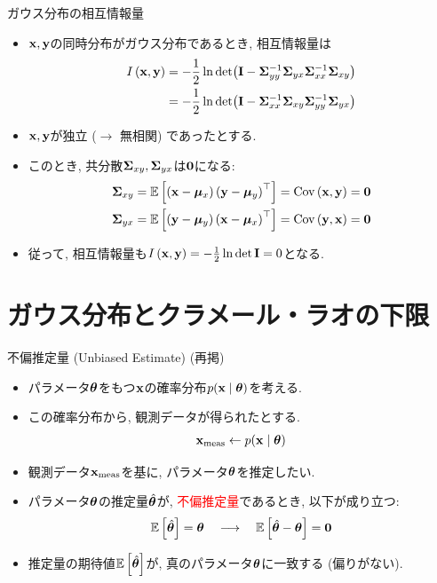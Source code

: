 \documentclass[dvipdfmx,notheorems,t]{beamer}
\begin{document}
\begin{frame}{ガウス分布の相互情報量}
\begin{itemize}
  \item $\vb{x}, \vb{y}$の同時分布がガウス分布であるとき, 相互情報量は
  \begin{align*}
    I \left( \vb{x}, \vb{y} \right) &= -\frac{1}{2} \ln \det(\vb{I}
      - \vb{\Sigma}_{yy}^{-1} \vb{\Sigma}_{yx} \vb{\Sigma}_{xx}^{-1} \vb{\Sigma}_{xy}) \\
      &= -\frac{1}{2} \ln \det(\vb{I}
        - \vb{\Sigma}_{xx}^{-1} \vb{\Sigma}_{xy} \vb{\Sigma}_{yy}^{-1} \vb{\Sigma}_{yx})
  \end{align*}
  \item $\vb{x}, \vb{y}$が独立 ($\to$ 無相関) であったとする.
  \item このとき, 共分散$\vb{\Sigma}_{xy}, \vb{\Sigma}_{yx}$は$\vb{0}$になる:
  \begin{align*}
    \vb{\Sigma}_{xy} &= \operatorname{\mathbb{E}} \left[ \left( \vb{x} - \vb*{\mu}_x \right) \left( \vb{y} - \vb*{\mu}_y \right)^\top \right]
      = \operatorname{Cov} \left( \vb{x}, \vb{y} \right) = \vb{0} \\
    \vb{\Sigma}_{yx} &= \operatorname{\mathbb{E}} \left[ \left( \vb{y} - \vb*{\mu}_y \right) \left( \vb{x} - \vb*{\mu}_x \right)^\top \right]
      = \operatorname{Cov} \left( \vb{y}, \vb{x} \right) = \vb{0}
  \end{align*}
  \item 従って, 相互情報量も$I \left( \vb{x}, \vb{y} \right) = -\frac{1}{2} \ln \det \vb{I} = 0$となる.
\end{itemize}
\end{frame}

\section{ガウス分布とクラメール・ラオの下限}

\begin{frame}{不偏推定量 (Unbiased Estimate) (再掲)}
\begin{itemize}
  \item パラメータ$\vb*{\theta}$をもつ$\vb{x}$の確率分布$p(\vb{x} \mid \vb*{\theta})$を考える.
  \item この確率分布から, 観測データが得られたとする.
  \begin{align*}
    \vb{x}_\mathrm{meas} \gets p(\vb{x} \mid \vb*{\theta})
  \end{align*}
  \item 観測データ$\vb{x}_\mathrm{meas}$を基に, パラメータ$\vb*{\theta}$を推定したい.
  \item パラメータ$\vb*{\theta}$の推定量$\hat{\vb*{\theta}}$が,
  \textcolor{red}{不偏推定量}であるとき, 以下が成り立つ:
  \begin{align*}
    \operatorname{\mathbb{E}} \left[ \hat{\vb*{\theta}} \right] = \vb*{\theta}
      \quad \longrightarrow \quad \operatorname{\mathbb{E}} \left[ \hat{\vb*{\theta}} - \vb*{\theta} \right] = \vb{0}
  \end{align*}
  \item 推定量の期待値$\operatorname{\mathbb{E}} \left[ \hat{\vb*{\theta}} \right]$が, 真のパラメータ$\vb*{\theta}$に一致する (偏りがない).
\end{itemize}
\end{frame}
\end{document}
